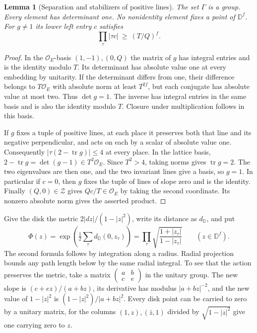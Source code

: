 \documentclass[a4paper,11pt]{article}
\newtheorem{lemma}[proposition]{Lemma}
\theoremstyle{definition}
\theoremstyle{remark}
\numberwithin{equation}{section}
\begin{document}
\begin{lemma}[Separation and stabilizers of positive lines]
\label{lem:binary230}
The set \(\Gamma\) is a group. Every element has determinant
one. No nonidentity element fixes a point of \(\mathbb D^f\).
For \(g\ne1\) its lower left entry \(c\) satisfies
\[
          \prod_\tau |\tau c|\ \ge\ (T/Q)^f.
\]
\end{lemma}
\begin{proof}
In the \(\mathcal O_E\)-basis \((1,-1),(0,Q)\) the matrix of
\(g\) has integral entries and is the identity modulo \(T\).
Its determinant has absolute value one at every embedding by
unitarity. If the determinant differs from one, their
difference belongs to \(T\mathcal O_E\) with absolute norm
at least \(T^{2f}\), but each conjugate has absolute value
at most two. Thus \(\det g=1\). The inverse has integral
entries in the same basis and is also the identity modulo
\(T\). Closure under multiplication follows in this basis.

If \(g\) fixes a tuple of positive lines, at each place it
preserves both that line and its negative perpendicular, and
acts on each by a scalar of absolute value one. Consequently
\(|\tau(2-\operatorname{tr}g)|\le4\) at every place.
In the lattice basis,
\(2-\operatorname{tr}g=\det(g-1)\in T^2\mathcal O_E\).
Since \(T^2>4\), taking norms gives \(\operatorname{tr}g=2\).
The two eigenvalues are then one, and the two invariant lines
give a basis, so \(g=1\). In particular if \(c=0\), then
\(g\) fixes the tuple of lines of slope zero and is the
identity. Finally \((Q,0)\in\mathcal Z\) gives
\(Qc/T\in\mathcal O_E\) by taking the second coordinate.
Its nonzero absolute norm gives the asserted product.
\end{proof}

Give the disk the metric \(2|dz|/(1-|z|^2)\), write its
distance as \(d_{\mathbb D}\), and put
\[
 \Phi(z)=\exp\!\left(\tfrac12\sum_\tau
                     d_{\mathbb D}(0,z_\tau)\right)
        =\prod_\tau\sqrt{\frac{1+|z_\tau|}{1-|z_\tau|}}
                \qquad(z\in\mathbb D^f).
\]
The second formula follows by integration along a radius.
Radial projection bounds any path length below by the same
radial integral. To see that the action preserves the metric, take a
matrix \(\left(\begin{smallmatrix}a&b\\ c&e\end{smallmatrix}\right)\) in the unitary group.
The new slope is \((c+ez)/(a+bz)\), its derivative has
modulus \(|a+bz|^{-2}\), and the new value of \(1-|z|^2\)
is \((1-|z|^2)/|a+bz|^2\). Every disk point can be carried
to zero by a unitary matrix, for the columns
\((1,z),(\bar z,1)\) divided by \(\sqrt{1-|z|^2}\)
give one carrying zero to \(z\).
\end{document}
